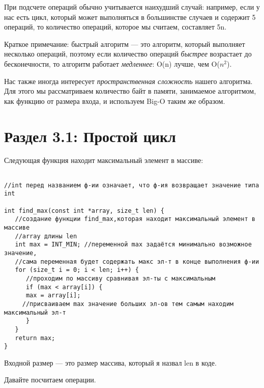 \vspace{\baselineskip}
При подсчете операций обычно учитывается наихудший случай: например, если у нас есть цикл, который может выполняться в большинстве случаев и содержит 5 операций, то количество операций, которое мы считаем, составляет 5n. 

\vspace{\baselineskip}
Краткое примечание: быстрый алгоритм --- это алгоритм, который выполняет несколько операций, поэтому если количество операций \textit{быстрее} возрастает до бесконечности, то алгоритм работает \textit{медленнее}: O(n) лучше, чем O($n^{2}$).

\vspace{\baselineskip}
Нас также иногда интересует \textit{пространственная сложность} нашего алгоритма. Для этого мы рассматриваем количество байт в памяти, занимаемое алгоритмом, как функцию от размера входа, и используем Big-O таким же образом.


\section*{Раздел 3.1: Простой цикл}

Следующая функция находит максимальный элемент в массиве:

\vspace{\baselineskip}
\begin{tcolorbox}
\begin{verbatim}

//int перед названием ф-ии означает, что ф-ия возвращает значение типа int

int find_max(const int *array, size_t len) { 
   //создание функции find_max,которая находит максимальный элемент в массиве 
   //array длины len
   int max = INT_MIN; //переменной max задаётся минимально возможное значение,
   //сама переменная будет содержать макс эл-т в конце выполнения ф-ии
   for (size_t i = 0; i < len; i++) {
      //проходим по массиву сравнивая эл-ты с максимальным
      if (max < array[i]) {
      max = array[i];
     //присваиваем max значение больших эл-ов тем самым находим максимальный эл-т
      }
   }
   return max;
}
\end{verbatim}
\end{tcolorbox}

\vspace{\baselineskip}
Входной размер --- это размер массива, который я назвал len в коде. 

\vspace{\baselineskip}
Давайте посчитаем операции.

